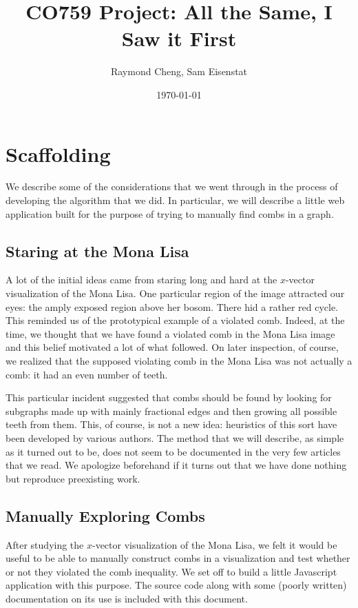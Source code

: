 \documentclass[11pt, letterpaper]{amsart}
\title{CO759 Project: All the Same, I Saw it First}
\author{Raymond Cheng, Sam Eisenstat}
\date{\today}
\theoremstyle{plain}
\theoremstyle{definition}
\theoremstyle{remark}
\begin{document}
\maketitle

\section{Scaffolding}
We describe some of the considerations that we went through in the process of
developing the algorithm that we did. In particular, we will describe a little
web application built for the purpose of trying to manually find combs in a graph.

\subsection{Staring at the Mona Lisa}
A lot of the initial ideas came from staring long and hard at the $x$-vector
visualization of the Mona Lisa. One particular region of the image attracted
our eyes: the amply exposed region above her bosom. There hid a rather red
cycle. This reminded us of the prototypical example of a violated comb. Indeed,
at the time, we thought that we have found a violated comb in the Mona Lisa
image and this belief motivated a lot of what followed. On later inspection, of
course, we realized that the supposed violating comb in the Mona Lisa was not
actually a comb: it had an even number of teeth.

This particular incident suggested that combs should be found by looking for
subgraphs made up with mainly fractional edges and then growing all possible
teeth from them. This, of course, is not a new idea: heuristics of this sort
have been developed by various authors. The method that we will describe, as
simple as it turned out to be, does not seem to be documented in the very few
articles that we read. We apologize beforehand if it turns out that we have
done nothing but reproduce preexisting work.

\subsection{Manually Exploring Combs}
After studying the $x$-vector visualization of the Mona Lisa, we felt it would
be useful to be able to manually construct combs in a visualization and test
whether or not they violated the comb inequality. We set off to build a little
Javascript application with this purpose. The source code along with some
(poorly written) documentation on its use is included with this document.
\end{document}
